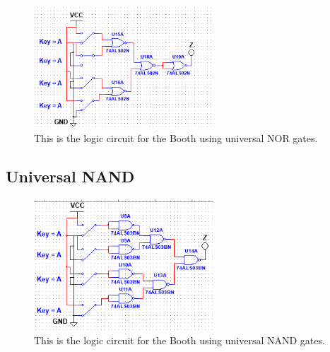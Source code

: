 \documentclass{article}
\begin{document}
\begin{figure}[!htb]
\centering
\includegraphics[width=0.6\textwidth]{images/BoothUniversalNOR.PNG}
\caption{\label{fig:booth nor}This is the logic circuit for the Booth using universal NOR gates.}
\end{figure}

\subsection{Universal NAND}

\begin{figure}[!htb]
\centering
\includegraphics[width=0.6\textwidth]{images/BoothUniversalNAND.PNG}
\caption{\label{fig:booth nand}This is the logic circuit for the Booth using universal NAND gates.}
\end{figure}
\end{document}
